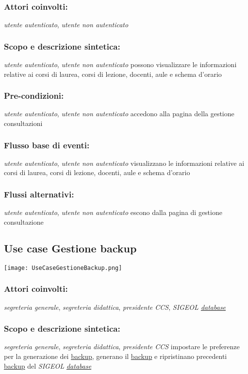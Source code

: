 \documentclass[11pt,a4paper]{article}
\begin{document}
\subsubsection*{Attori coinvolti:}
\textit{utente autenticato}, \textit{utente non autenticato}
\subsubsection*{Scopo e descrizione sintetica:}
\textit{utente autenticato}, \textit{utente non autenticato} possono visualizzare le informazioni relative ai corsi di laurea, corsi di lezione, docenti, aule e schema d'orario
\subsubsection*{Pre-condizioni:}
\textit{utente autenticato}, \textit{utente non autenticato} accedono alla pagina della gestione consultazioni
\subsubsection*{Flusso base di eventi:}
\textit{utente autenticato}, \textit{utente non autenticato} visualizzano le informazioni relative ai corsi di laurea, corsi di lezione, docenti, aule e schema d'orario
\subsubsection*{Flussi alternativi:}
 \textit{utente autenticato}, \textit{utente non autenticato} escono dalla pagina di gestione consultazione

\subsection{Use case Gestione backup}
\begin{center} 
 \texttt{[image: UseCaseGestioneBackup.png]}
\end{center}
\subsubsection*{Attori coinvolti:}
\textit{segreteria generale}, \textit{segreteria didattica}, \textit{presidente CCS}, \textit{SIGEOL \underline{database}}
\subsubsection*{Scopo e descrizione sintetica:}
\textit{segreteria generale}, \textit{segreteria didattica}, \textit{presidente CCS} impostare le preferenze per la generazione dei \underline{backup}, generano il \underline{backup} e ripristinano precedenti \underline{backup} del \textit{SIGEOL \underline{database}}
\end{document}
